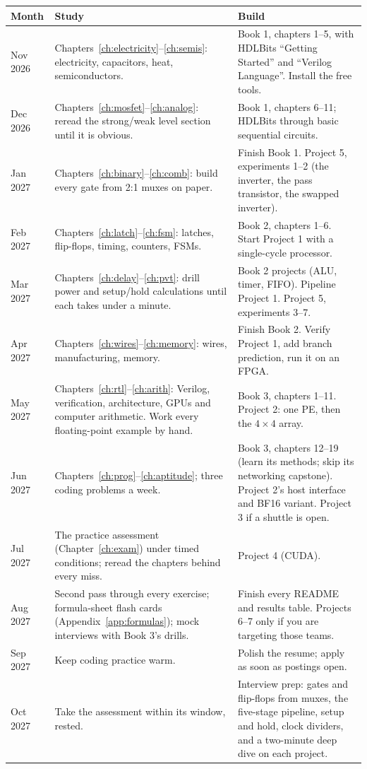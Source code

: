 \begin{center}
\small
\begin{tabularx}{\linewidth}{>{\raggedright\arraybackslash}p{2.1cm}>{\raggedright\arraybackslash}X>{\raggedright\arraybackslash}X}
\toprule
Month & Study & Build \\
\midrule
Nov 2026 & Chapters~\ref{ch:electricity}--\ref{ch:semis}: electricity, capacitors, heat, semiconductors. & Book 1, chapters 1--5, with HDLBits ``Getting Started'' and ``Verilog Language''. Install the free tools. \\
Dec 2026 & Chapters~\ref{ch:mosfet}--\ref{ch:analog}: reread the strong/weak level section until it is obvious. & Book 1, chapters 6--11; HDLBits through basic sequential circuits. \\
Jan 2027 & Chapters~\ref{ch:binary}--\ref{ch:comb}: build every gate from 2:1 muxes on paper. & Finish Book 1. Project 5, experiments 1--2 (the inverter, the pass transistor, the swapped inverter). \\
Feb 2027 & Chapters~\ref{ch:latch}--\ref{ch:fsm}: latches, flip-flops, timing, counters, FSMs. & Book 2, chapters 1--6. Start Project 1 with a single-cycle processor. \\
Mar 2027 & Chapters~\ref{ch:delay}--\ref{ch:pvt}: drill power and setup/hold calculations until each takes under a minute. & Book 2 projects (ALU, timer, FIFO). Pipeline Project 1. Project 5, experiments 3--7. \\
Apr 2027 & Chapters~\ref{ch:wires}--\ref{ch:memory}: wires, manufacturing, memory. & Finish Book 2. Verify Project 1, add branch prediction, run it on an FPGA. \\
May 2027 & Chapters~\ref{ch:rtl}--\ref{ch:arith}: Verilog, verification, architecture, GPUs and computer arithmetic. Work every floating-point example by hand. & Book 3, chapters 1--11. Project 2: one PE, then the $4 \times 4$ array. \\
Jun 2027 & Chapters~\ref{ch:prog}--\ref{ch:aptitude}; three coding problems a week. & Book 3, chapters 12--19 (learn its methods; skip its networking capstone). Project 2's host interface and BF16 variant. Project 3 if a shuttle is open. \\
Jul 2027 & The practice assessment (Chapter~\ref{ch:exam}) under timed conditions; reread the chapters behind every miss. & Project 4 (CUDA). \\
Aug 2027 & Second pass through every exercise; formula-sheet flash cards (Appendix~\ref{app:formulas}); mock interviews with Book 3's drills. & Finish every README and results table. Projects 6--7 only if you are targeting those teams. \\
Sep 2027 & Keep coding practice warm. & Polish the resume; apply as soon as postings open. \\
Oct 2027 & Take the assessment within its window, rested. & Interview prep: gates and flip-flops from muxes, the five-stage pipeline, setup and hold, clock dividers, and a two-minute deep dive on each project. \\
\bottomrule
\end{tabularx}
\end{center}

